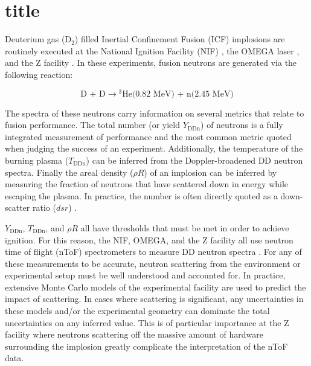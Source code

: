 \chapter{title}

	Deuterium gas (D$_2$) filled Inertial Confinement Fusion (ICF) implosions are routinely executed at the National Ignition Facility (NIF) \cite{NIF_Ref}, the OMEGA laser \cite{OMEGA_Ref}, and the Z facility \cite{Z_Ref}. In these experiments, fusion neutrons are generated via the following reaction:

\begin{equation}
	\textrm{D + D} \rightarrow  \textrm{}^3\textrm{He(0.82 MeV) + n(2.45 MeV)}
\end{equation}

The spectra of these neutrons carry information on several metrics that relate to fusion performance. The total number (or yield $Y_{\mathrm{DDn}}$) of neutrons is a fully integrated measurement of performance and the most common metric quoted when judging the success of an experiment. Additionally, the temperature of the burning plasma ($T_{\mathrm{DDn}}$) can be inferred from the Doppler-broadened DD neutron spectra. \cite{Brysk_1973} Finally the areal density ($\rho R$) of an implosion can be inferred by measuring the fraction of neutrons that have scattered down in energy while escaping the plasma. In practice, the number is often directly quoted as a down-scatter ratio ($dsr$) \cite{rhoR_Ref, Gatu-Johnson_RSI_2012}.

$Y_{\mathrm{DDn}}$, $T_{\mathrm{DDn}}$, and $\rho R$ all have thresholds that must be met in order to achieve ignition. \cite{Lindl_PoP_1995} For this reason, the NIF, OMEGA, and the Z facility all use neutron time of flight (nToF) spectrometers to measure DD neutron spectra \cite{Glebov_RSI_2010, Leeper_Z_NTOFs, Hahn_Z_NTOFs, Glebov_RSI_2014}. For any of these measurements to be accurate, neutron scattering from the environment or experimental setup must be well understood and accounted for. In practice, extensive Monte Carlo models of the experimental facility are used to predict the impact of scattering. In cases where scattering is significant, any uncertainties in these models and/or the experimental geometry can dominate the total uncertainties on any inferred value. This is of particular importance at the Z facility where neutrons scattering off the massive amount of hardware surrounding the implosion greatly complicate the interpretation of the nToF data. 

